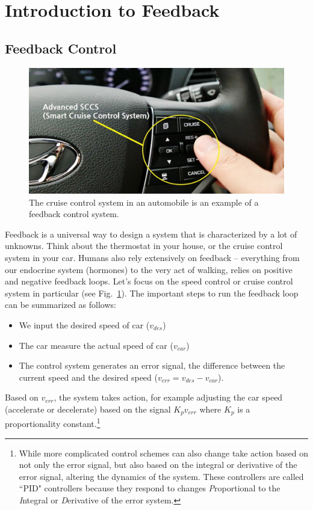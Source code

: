 \section{Introduction to Feedback}
\subsection{Feedback Control}
\begin{figure}[tb]
\centering
\includegraphics[width=.5\columnwidth]{image_0.png}
\caption{The cruise control system in an automobile is an example of a feedback control system.} \label{fig:image_0.png}
\end{figure}
Feedback is a universal way to design a system that is characterized by a lot of unknowns.  Think about the thermostat in your house, or the cruise control system in your car.  Humans also rely extensively on feedback -- everything from our endocrine system (hormones) to the very act of walking, relies on positive and negative feedback loops.  
Let's focus on the speed control or cruise control system in particular (see Fig.~\ref{fig:image_0.png}).  The important steps to run the feedback loop can be summarized as follows:
    \begin{itemize}
        \item We input the desired speed of car ($v_{des}$)
        \item The car measure the actual speed of car ($v_{car}$)
        \item The control system generates an error signal, the difference between the current speed and the desired speed ($v_{err} = v_{des} - v_{car}$).
    \end{itemize}
Based on $v_{err}$, the system takes action, for example adjusting the car speed (accelerate or decelerate) based on the signal $K_p v_{err}$ where $K_p$ is a proportionality constant.\footnote{While more complicated control schemes can also change take action based on not only the error signal, but also based on the integral or derivative of the error signal, altering the dynamics of the system.  These controllers are called ``PID" controllers because they respond to changes \emph{P}roportional to the \emph{I}ntegral or \emph{D}erivative of the error system.}
